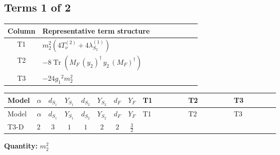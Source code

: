 \documentclass[8pt]{article}
\begin{document}
\begin{landscape}
\subsection*{Terms 1 of 2}
\begin{center}
\begin{tabular}{@{}c >{\raggedright\arraybackslash}p{0.82\linewidth}@{}}
\toprule
Column & Representative term structure \\
\midrule
T1 & \(\displaystyle {m_2^2} (4 T_{\nu}^{(2)}+4 {\lambda_{S_2}^{(1)}})\) \\
\midrule
T2 & \(\displaystyle -8 \operatorname{Tr}\!\left({M_F}\,\left({y_2}\right)^{\dagger}\,{y_2}\,\left({M_F}\right)^{\dagger}\right)\) \\
\midrule
T3 & \(\displaystyle -24 {g_1}^2 {m_2^2}\) \\
\midrule
\bottomrule
\end{tabular}
\end{center}
\smallskip
\tiny
\begin{longtable}{@{}llcccccc >{\raggedright\arraybackslash}p{0.21\linewidth} >{\raggedright\arraybackslash}p{0.21\linewidth} >{\raggedright\arraybackslash}p{0.21\linewidth}@{}}
\toprule
Model & $\alpha$ & $d_{S_1}$ & $Y_{S_1}$ & $d_{S_2}$ & $Y_{S_2}$ & $d_F$ & $Y_F$ & T1 & T2 & T3 \\
\midrule
\endfirsthead
\toprule
Model & $\alpha$ & $d_{S_1}$ & $Y_{S_1}$ & $d_{S_2}$ & $Y_{S_2}$ & $d_F$ & $Y_F$ & T1 & T2 & T3 \\
\midrule
\endhead
T3-D & $2$ & $3$ & $1$ & $1$ & $2$ & $2$ & $\frac{3}{2}$ & \scriptsize\adjustbox{max width=\linewidth}{$\begin{gathered} {m_2^2} (4 T_{\nu}^{(2)}+4 {\lambda_{S_2}^{(1)}})\end{gathered}$} & \scriptsize\adjustbox{max width=\linewidth}{$\begin{gathered} -8 \operatorname{Tr}\!\left({M_F}\,\left({y_2}\right)^{\dagger}\,{y_2}\,\left({M_F}\right)^{\dagger}\right)\end{gathered}$} & \scriptsize\adjustbox{max width=\linewidth}{$\begin{gathered} -24 {g_1}^2 {m_2^2}\end{gathered}$} \\
\midrule
\bottomrule
\end{longtable}
\clearpage
\noindent\textbf{Quantity: }$m_2^2$\par\smallskip

\end{landscape}
\end{document}

